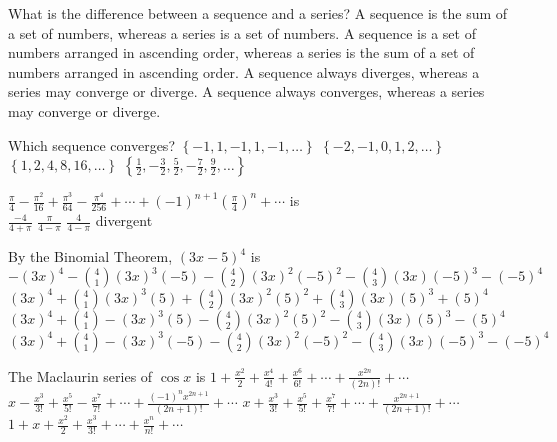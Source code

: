 \begin{question}
What is the difference between a sequence and a series? 
\choices
{A sequence is the sum of a set of numbers, whereas a series is a set of numbers.}
{A sequence is a set of numbers arranged in ascending order, whereas a series is the sum of a set of numbers arranged in ascending order.}
{ }
{A sequence always diverges, whereas a series may converge or diverge.}
{A sequence always converges, whereas a series may converge or diverge.}
\end{question}

\begin{question}
Which sequence converges?
\choices
{\(\left\{-1, 1, -1, 1, -1, \dots\right\}\)}
{\(\left\{-2, -1, 0, 1, 2, \dots\right\}\)}
{\(\left\{1, 2, 4, 8, 16, \dots\right\}\)}
{}
{\(\left\{\frac{1}{2}, -\frac{3}{2}, \frac{5}{2}, -\frac{7}{2}, \frac{9}{2}, \dots\right\}\)}
\end{question}



\begin{question}
\(\frac{\pi}{4} - \frac{\pi^2}{16} + \frac{\pi^3}{64} - \frac{\pi^4}{256} + \cdots + (-1)^{n + 1} \left(\frac{\pi}{4}\right)^n + \cdots\) \; is \\
\choicesline
{\(\frac{-4}{4 + \pi}\)}
{\(\frac{\pi}{4 - \pi}\)}
{}
{\(\frac{4}{4 - \pi}\)}
{divergent}
\end{question}

\begin{question}
By the Binomial Theorem, \((3x - 5)^4\) is 
\choices
{}
{\(-(3x)^4 - {4 \choose 1} (3x)^3 (-5) - {4 \choose 2} (3x)^2 (-5)^2 - {4 \choose 3} (3x) (-5)^3 - (-5)^4\)}
{\((3x)^4 + {4 \choose 1} (3x)^3 (5) + {4 \choose 2} (3x)^2 (5)^2 + {4 \choose 3} (3x) (5)^3 + (5)^4\)}
{\((3x)^4 + {4 \choose 1} - (3x)^3 (5) - {4 \choose 2} (3x)^2 (5)^2 - {4 \choose 3} (3x) (5)^3 - (5)^4\)}
{\((3x)^4 + {4 \choose 1} - (3x)^3 (-5) - {4 \choose 2} (3x)^2 (-5)^2 - {4 \choose 3} (3x) (-5)^3 - (-5)^4\)}
\end{question}

\begin{question}
The Maclaurin series of \(\cos x\) is 
\choices
{\(1 + \frac{x^2}{2} + \frac{x^4}{4!} + \frac{x^6}{6!} + \cdots + \frac{x^{2n}}{(2n)!} + \cdots\)}
{\(x - \frac{x^3}{3!} + \frac{x^5}{5!} - \frac{x^7}{7!} + \cdots + \frac{(-1)^n x^{2n + 1}}{(2n + 1)!} + \cdots\)}
{\(x + \frac{x^3}{3!} + \frac{x^5}{5!} + \frac{x^7}{7!} + \cdots + \frac{x^{2n + 1}}{(2n + 1)!} + \cdots\)}
{\(1 + x + \frac{x^2}{2} + \frac{x^3}{3!} + \cdots + \frac{x^n}{n!} + \cdots\)}
{}
\end{question}


